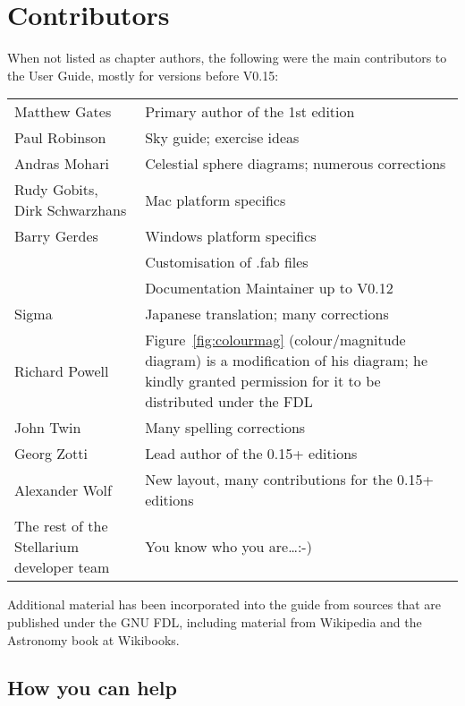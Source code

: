 
\chapter{Contributors}

When not listed as chapter authors, the following were the main contributors to the User Guide, mostly for versions before V0.15:
\begin{longtabu} to \textwidth {l|X}
\toprule
Matthew Gates & Primary author of the 1st edition\\
Paul Robinson &Sky guide; exercise ideas\\
Andras Mohari &Celestial sphere diagrams; numerous corrections\\
Rudy Gobits, Dirk Schwarzhans & Mac platform specifics\\
Barry Gerdes&Windows platform specifics \\
            &Customisation of .fab files\\
            &Documentation Maintainer up to V0.12\\
Sigma       &Japanese translation; many corrections\\ %
Richard Powell& Figure~\ref{fig:colourmag} (colour/magnitude diagram) is a modification of his diagram; he kindly granted permission for it to be distributed under the FDL\\
John Twin & Many spelling corrections \\
Georg Zotti & Lead author of the 0.15+ editions\\
Alexander Wolf & New layout, many contributions for the 0.15+ editions\\
The rest of the Stellarium developer team & You know who you are\ldots :-)\tabularnewline
\bottomrule
\end{longtabu}


Additional material has been incorporated into the guide from sources
that are published under the GNU FDL, including material from Wikipedia
and the Astronomy book at Wikibooks.

\section{How you can help}
\label{sec:HowYouCanHelp}

